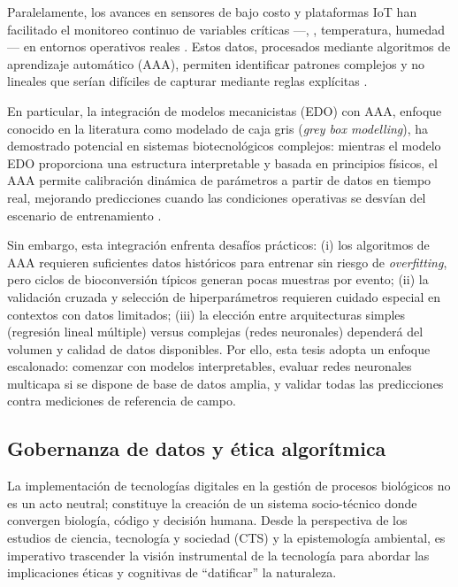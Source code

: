Paralelamente, los avances en sensores de bajo costo y plataformas IoT han facilitado el monitoreo continuo de variables críticas ---, , temperatura, humedad--- en entornos operativos reales \cite{duobieneDevelopmentWirelessSensor2022, rajRealTimeEstimation2023a, yavariArtEMonArtificialIntelligence2023}. Estos datos, procesados mediante algoritmos de aprendizaje automático (AAA), permiten identificar patrones complejos y no lineales que serían difíciles de capturar mediante reglas explícitas \cite{chenOptimizationModelProcess2021a, weichertReviewMachineLearning2019}.

En particular, la integración de modelos mecanicistas (EDO) con AAA, enfoque conocido en la literatura como modelado de caja gris (\textit{grey box modelling}), ha demostrado potencial en sistemas biotecnológicos complejos: mientras el modelo EDO proporciona una estructura interpretable y basada en principios físicos, el AAA permite calibración dinámica de parámetros a partir de datos en tiempo real, mejorando predicciones cuando las condiciones operativas se desvían del escenario de entrenamiento \cite{guillaumeAsymptoticEstimatedDigestibility2023, kobelskiProcessOptimizationBlack2024}.

Sin embargo, esta integración enfrenta desafíos prácticos: (i) los algoritmos de AAA requieren suficientes datos históricos para entrenar sin riesgo de \textit{overfitting}, pero ciclos de bioconversión típicos generan pocas muestras por evento; (ii) la validación cruzada y selección de hiperparámetros requieren cuidado especial en contextos con datos limitados; (iii) la elección entre arquitecturas simples (regresión lineal múltiple) versus complejas (redes neuronales) dependerá del volumen y calidad de datos disponibles. Por ello, esta tesis adopta un enfoque escalonado: comenzar con modelos interpretables, evaluar redes neuronales multicapa si se dispone de base de datos amplia, y validar todas las predicciones contra mediciones de referencia de campo.

\subsection{Gobernanza de datos y ética algorítmica}

La implementación de tecnologías digitales en la gestión de procesos biológicos no es un acto neutral; constituye la creación de un sistema socio-técnico donde convergen biología, código y decisión humana. Desde la perspectiva de los estudios de ciencia, tecnología y sociedad (CTS) y la epistemología ambiental, es imperativo trascender la visión instrumental de la tecnología para abordar las implicaciones éticas y cognitivas de ``datificar'' la naturaleza.

